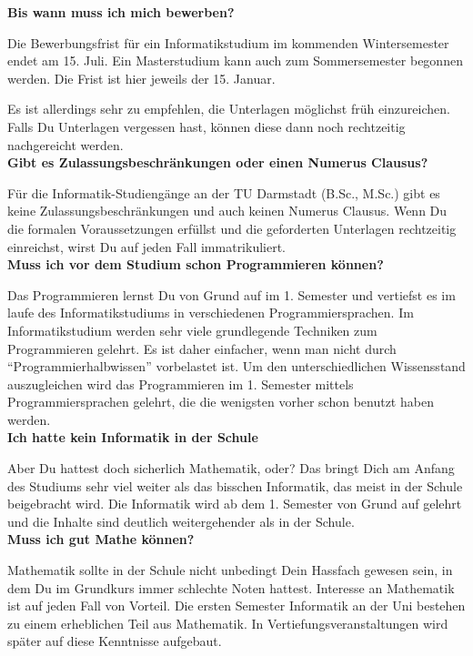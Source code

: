{}
{\textbf{Bis wann muss ich mich bewerben?}

Die Bewerbungsfrist für ein Informatikstudium im kommenden Wintersemester endet am 15. Juli. Ein Masterstudium kann auch zum Sommersemester begonnen werden. Die Frist ist hier jeweils der 15. Januar.

Es ist allerdings sehr zu empfehlen, die Unterlagen möglichst früh einzureichen. Falls Du Unterlagen vergessen hast, können diese dann noch rechtzeitig nachgereicht werden.\\

\textbf{Gibt es Zulassungsbeschränkungen oder einen Numerus Clausus?}

Für die Informatik-Studiengänge an der TU Darmstadt (B.Sc., M.Sc.) gibt es keine Zulassungsbeschränkungen und auch keinen Numerus Clausus. Wenn Du die formalen Voraussetzungen erfüllst und die geforderten Unterlagen rechtzeitig einreichst, wirst Du auf jeden Fall immatrikuliert.\\

\textbf{Muss ich vor dem Studium schon Programmieren können?}

Das Programmieren lernst Du von Grund auf im 1. Semester und vertiefst es im laufe des Informatikstudiums in verschiedenen Programmiersprachen. Im Informatikstudium werden sehr viele grundlegende Techniken zum Programmieren gelehrt. Es ist daher einfacher, wenn man nicht durch "`Programmierhalbwissen"' vorbelastet ist. Um den unterschiedlichen Wissensstand auszugleichen wird das Programmieren im 1. Semester mittels Programmiersprachen gelehrt, die die wenigsten vorher schon benutzt haben werden.\\

\textbf{Ich hatte kein Informatik in der Schule}

Aber Du hattest doch sicherlich Mathematik, oder? Das bringt Dich am Anfang des Studiums sehr viel weiter als das bisschen Informatik, das meist in der Schule beigebracht wird. Die Informatik wird ab dem 1. Semester von Grund auf gelehrt und die Inhalte sind deutlich weitergehender als in der Schule.\\

\textbf{Muss ich gut Mathe können?}

Mathematik sollte in der Schule nicht unbedingt Dein Hassfach gewesen sein, in dem Du im Grundkurs immer schlechte Noten hattest. Interesse an Mathematik ist auf jeden Fall von Vorteil. Die ersten Semester Informatik an der Uni bestehen zu einem erheblichen Teil aus Mathematik. In Vertiefungsveranstaltungen wird später auf diese Kenntnisse aufgebaut.\\

}
